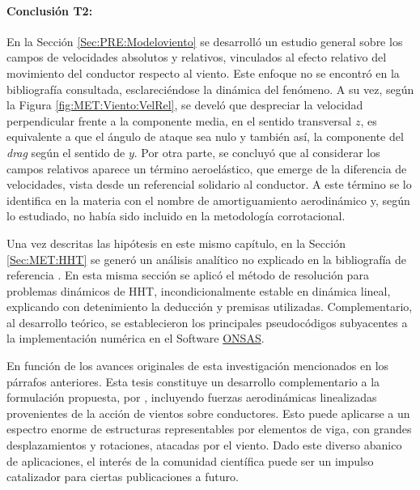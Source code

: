 \paragraph*{Conclusión T2:}
En la Sección \ref{Sec:PRE:Modeloviento} se desarrolló un estudio general sobre los campos de velocidades absolutos y relativos, vinculados al efecto relativo del movimiento del conductor respecto al viento. Este enfoque no se encontró en la bibliografía consultada, esclareciéndose la dinámica del fenómeno. A su vez, según la Figura \ref{fig:MET:Viento:VelRel}, se develó que despreciar la velocidad perpendicular frente a la componente media, en el sentido transversal $z$,  es equivalente a que el ángulo de ataque sea nulo y también así, la componente del \textit{drag} según el sentido de $y$. Por otra parte, se concluyó que al considerar los campos relativos aparece un término aeroelástico, que emerge de la diferencia de velocidades, vista desde un referencial solidario al conductor. A este término se lo identifica en la materia con el nombre de amortiguamiento aerodinámico y, según lo estudiado, no había sido incluido en la metodología corrotacional. 

Una vez descritas las hipótesis en este mismo capítulo, en la Sección \ref{Sec:MET:HHT} se generó un análisis analítico no explicado en la bibliografía de referencia \citep{Le2014}. En esta misma sección se aplicó el método de resolución para problemas dinámicos de HHT, incondicionalmente estable en dinámica lineal, explicando con detenimiento la deducción y premisas utilizadas. Complementario, al desarrollo teórico, se establecieron los principales pseudocódigos subyacentes a la implementación numérica en el Software \href{https://github.com/ONSAS/ONSAS.m/}{ONSAS}.

En función de los avances originales de esta investigación mencionados en los párrafos anteriores. Esta tesis constituye un desarrollo complementario a la formulación propuesta, por \cite{Le2014}, incluyendo fuerzas aerodinámicas linealizadas provenientes de la acción de vientos sobre conductores. Esto puede aplicarse a un espectro enorme de estructuras representables por elementos de viga, con grandes desplazamientos y rotaciones, atacadas por el viento. Dado este diverso abanico de aplicaciones, el interés de la comunidad científica puede ser un impulso catalizador para ciertas publicaciones a futuro.

